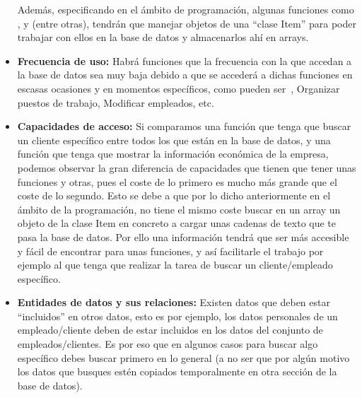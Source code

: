 \documentclass[11pt, a4paper, twoside, titlepage]{article}
\begin{document}
\begin{itemize}
				Además, especificando en el ámbito de programación, algunas funciones como ,  y  (entre otras), tendrán que manejar objetos de una ``clase Item'' para poder trabajar con ellos en la base de datos y almacenarlos ahí en \gls{arrays}. 
				\item \textbf{Frecuencia de uso: } Habrá funciones que la frecuencia con la que accedan a la base de datos sea muy baja debido a que se accederá a dichas funciones en escasas ocasiones y en momentos específicos, como pueden ser~, Organizar puestos de trabajo, Modificar empleados, etc. 
				\item \textbf{Capacidades de acceso: } Si comparamos una función que tenga que buscar un cliente específico entre todos los que están en la base de datos, y una función que tenga que mostrar la información económica de la empresa, podemos observar la gran diferencia de capacidades que tienen que tener unas funciones y otras, pues el coste de lo primero es mucho más grande que el coste de lo segundo. Esto se debe a que por lo dicho anteriormente en el ámbito de la programación, no tiene el mismo coste buscar en un array un objeto de la clase Item en concreto a cargar unas cadenas de texto que te pasa la base de datos. Por ello una información tendrá que ser más accesible y fácil de encontrar para unas funciones, y así facilitarle el trabajo por ejemplo al que tenga que realizar la tarea de buscar un cliente/empleado específico. 
				\item \textbf{Entidades de datos y sus relaciones: } Existen datos que deben estar ``incluidos'' en otros datos, esto es por ejemplo, los datos personales de un empleado/cliente deben de estar incluidos en los datos del conjunto de empleados/clientes. Es por eso que en algunos casos para buscar algo específico debes buscar primero en lo general (a no ser que por algún motivo los datos que busques estén copiados temporalmente en otra sección de la base de datos). 
			\end{itemize}
\end{document}
